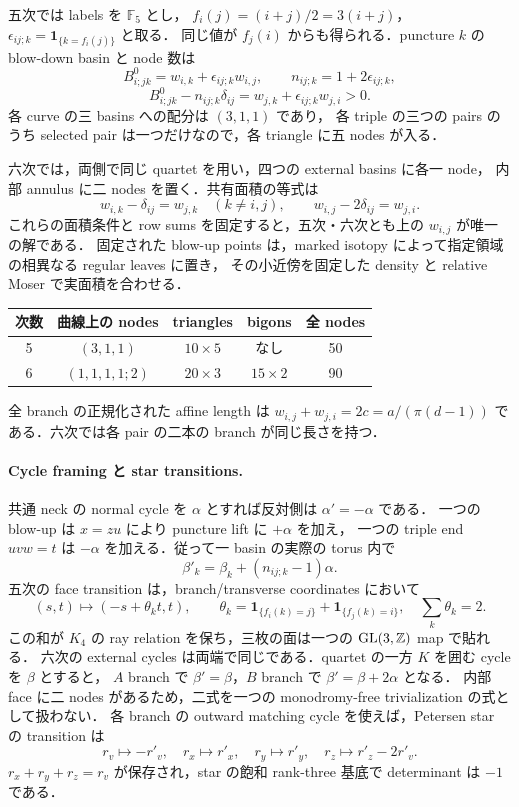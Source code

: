 五次では labels を $\mathbb F_5$ とし，
$f_i(j)=(i+j)/2=3(i+j)$，
$\epsilon_{ij;k}=\mathbf1_{\{k=f_i(j)\}}$ と取る．
同じ値が $f_j(i)$ からも得られる．puncture $k$ の blow-down basin と node 数は
\[
 B^0_{i;jk}=w_{i,k}+\epsilon_{ij;k}w_{i,j},\qquad
 n_{ij;k}=1+2\epsilon_{ij;k},
\]
\[
 B^0_{i;jk}-n_{ij;k}\delta_{ij}
 =w_{j,k}+\epsilon_{ij;k}w_{j,i}>0.
\]
各 curve の三 basins への配分は $(3,1,1)$ であり，
各 triple の三つの pairs のうち selected pair は一つだけなので，各 triangle に五 nodes が入る．

六次では，両側で同じ quartet を用い，四つの external basins に各一 node，
内部 annulus に二 nodes を置く．共有面積の等式は
\[
 w_{i,k}-\delta_{ij}=w_{j,k}\quad(k\ne i,j),\qquad
 w_{i,j}-2\delta_{ij}=w_{j,i}.
\]
これらの面積条件と row sums を固定すると，五次・六次とも上の $w_{i,j}$ が唯一の解である．
固定された blow-up points は，marked isotopy によって指定領域の相異なる regular leaves に置き，
その小近傍を固定した density と relative Moser で実面積を合わせる．

\begin{center}
\begin{tabular}{c|c|c|c|c}
次数&曲線上の nodes&triangles&bigons&全 nodes\\\hline
5&$(3,1,1)$&$10\times5$&なし&50\\
6&$(1,1,1,1;2)$&$20\times3$&$15\times2$&90
\end{tabular}
\end{center}
全 branch の正規化された affine length は
$w_{i,j}+w_{j,i}=2c=a/(\pi(d-1))$ である．六次では各 pair の二本の branch が同じ長さを持つ．

\paragraph{Cycle framing と star transitions.}
共通 neck の normal cycle を $\alpha$ とすれば反対側は $\alpha'=-\alpha$ である．
一つの blow-up は $x=zu$ により puncture lift に $+\alpha$ を加え，
一つの triple end $uvw=t$ は $-\alpha$ を加える．従って一 basin の実際の torus 内で
\[
 \beta'_k=\beta_k+(n_{ij;k}-1)\alpha.
\]
五次の face transition は，branch/transverse coordinates において
\[
 (s,t)\longmapsto(-s+\theta_kt,t),\qquad
 \theta_k=\mathbf1_{\{f_i(k)=j\}}+\mathbf1_{\{f_j(k)=i\}},
 \quad\sum_k\theta_k=2.
\]
この和が $K_4$ の ray relation を保ち，三枚の面は一つの $\operatorname{GL}(3,\mathbb Z)$ map で貼れる．
六次の external cycles は両端で同じである．quartet の一方 $K$ を囲む cycle を $\beta$ とすると，
$A$ branch で $\beta'=\beta$，$B$ branch で $\beta'=\beta+2\alpha$ となる．
内部 face に二 nodes があるため，二式を一つの monodromy-free trivialization の式として扱わない．
各 branch の outward matching cycle を使えば，Petersen star の transition は
\[
 r_v\mapsto-r'_v,\quad r_x\mapsto r'_x,\quad r_y\mapsto r'_y,
 \quad r_z\mapsto r'_z-2r'_v.
\]
$r_x+r_y+r_z=r_v$ が保存され，star の飽和 rank-three 基底で determinant は $-1$ である．

